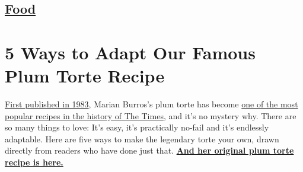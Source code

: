\hypertarget{-food-}{%
\subsection{\texorpdfstring{ \href{/section/food}{Food}
}{ Food }}\label{-food-}}

\hypertarget{5-ways-to-adapt-our-famous-plum-torte-recipe}{%
\section{5 Ways to Adapt Our Famous Plum Torte
Recipe}\label{5-ways-to-adapt-our-famous-plum-torte-recipe}}

\href{http://www.nytimes3xbfgragh.onion/1983/09/21/garden/food-notes-the-food-at-59th-and-lex.html}{First
published in 1983}, Marian Burros's plum torte has become
\href{http://www.nytimes3xbfgragh.onion/2016/09/14/dining/marian-burros-plum-torte-recipe.html}{one
of the most popular recipes in the history of The Times}, and it's no
mystery why. There are so many things to love: It's easy, it's
practically no-fail and it's endlessly adaptable. Here are five ways to
make the legendary torte your own, drawn directly from readers who have
done just that.
\textbf{\href{http://cooking.nytimes3xbfgragh.onion/recipes/3783-original-plum-torte}{And
her original plum torte recipe is here.}}

